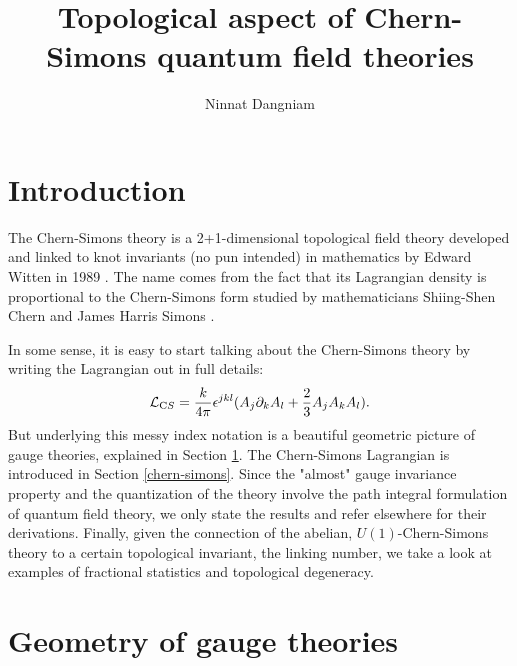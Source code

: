 \documentclass[aps,nofootinbib]{revtex4}
\makeatletter
\newenvironment{chapquote}[2][2em]
  {\setlength{\@tempdima}{#1}%
   \def\chapquote@author{#2}%
   \parshape 1 \@tempdima \dimexpr\textwidth-2\@tempdima\relax%
   \itshape}
  {\par\normalfont\hfill---\ \chapquote@author\hspace*{\@tempdima}\par\bigskip}
\makeatother
\begin{document}
\title{Topological aspect of Chern-Simons quantum field theories}


\author{Ninnat Dangniam}

\begin{abstract}
\end{abstract}

\maketitle

\tableofcontents

\section*{Introduction}

The Chern-Simons theory is a 2+1-dimensional topological field theory developed and linked to knot invariants (no pun intended) in mathematics by Edward Witten in 1989 \cite{Witten89}. The name comes from the fact that its Lagrangian density is proportional to the Chern-Simons form studied by mathematicians Shiing-Shen Chern and James Harris Simons \cite{Chern74}.

In some sense, it is easy to start talking about the Chern-Simons theory by writing the Lagrangian out in full details:
\begin{align*}
\mathcal{L}_{\text CS} = \frac{k}{4\pi} \epsilon^{j k l} (A_j \partial_k A_l + \frac{2}{3} A_j A_k A_l). 
\end{align*}
But underlying this messy index notation is a beautiful geometric picture of gauge theories, explained in Section \ref{geometry}. The Chern-Simons Lagrangian is introduced in Section \ref{chern-simons}. Since the "almost" gauge invariance property and the quantization of the theory involve the path integral formulation of quantum field theory, we only state the results and refer elsewhere for their derivations. Finally, given the connection of the abelian, $U(1)$-Chern-Simons theory to a certain topological invariant, the linking number, we take a look at examples of fractional statistics and topological degeneracy.

\section{Geometry of gauge theories}\label{geometry}
\end{document}
